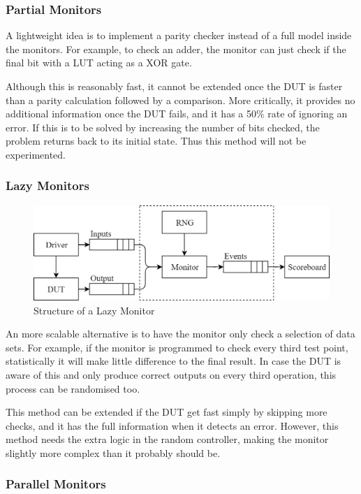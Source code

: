\subsubsection{Partial Monitors}
A lightweight idea is to implement a parity checker instead of a full model inside the monitors.
For example, to check an adder, the monitor can just check if the final bit with a LUT acting as a XOR gate.

Although this is reasonably fast, it cannot be extended once the DUT is faster than a parity calculation followed by a comparison.
More critically, it provides no additional information once the DUT fails, and it has a 50\% rate of ignoring an error.
If this is to be solved by increasing the number of bits checked, the problem returns back to its initial state.
Thus this method will not be experimented.

\subsubsection{Lazy Monitors}

\begin{figure}[H]
  \centering
  \includegraphics[width=12cm]{img/LazMon}
  \caption{Structure of a Lazy Monitor}
  \label{LazMon}
\end{figure}

An more scalable alternative is to have the monitor only check a selection of data sets.
For example, if the monitor is programmed to check every third test point, statistically it will make little difference to the final result.
In case the DUT is aware of this and only produce correct outputs on every third operation, this process can be randomised too.

This method can be extended if the DUT get fast simply by skipping more checks, and it has the full information when it detects an error.
However, this method needs the extra logic in the random controller, making the monitor slightly more complex than it probably should be.

\subsubsection{Parallel Monitors}


